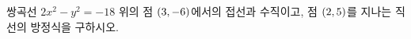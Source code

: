 쌍곡선 $2x^2-y^2=-18$ 위의 점 $(3{,}\mkern3mu\mathopen{}-6)$에서의 접선과 수직이고, 점 $(2{,}\mkern3mu\mathopen{}5)$를 지나는 직선의 방정식을 구하시오.
